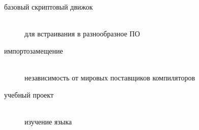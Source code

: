 \clearpage{}\label{intro}

\begin{description}
    \item[базовый скриптовый движок]\ \\для встраивания в разнообразное ПО
    \item[импортозамещение]\ \\независимость от мировых поставщиков компиляторов
    \item[учебный проект]\ \\изучение языка \D
\end{description}
